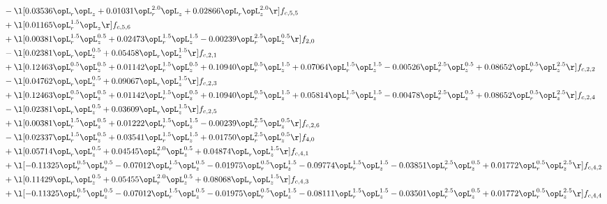\begin{alignat}{2}
& - \l[  0.03536 \opL_r \opL_z +  0.01031 \opL_r^{2.0} \opL_z +  0.02866 \opL_r \opL_z^{2.0}  \r] f_{c,5,5} \nonumber \\ 
& + \l[  0.01165 \opL_r^{1.5} \opL_z  \r] f_{c,5,6} \nonumber \\ 
& + \l[  0.00381 \opL_r^{1.5} \opL_z^{0.5} +  0.02473 \opL_r^{1.5} \opL_z^{1.5}   -0.00239 \opL_r^{2.5} \opL_z^{0.5}  \r] f_{2,0} \nonumber \\ 
& - \l[  0.02381 \opL_r \opL_z^{0.5} +  0.05458 \opL_r \opL_z^{1.5}  \r] f_{c,2,1} \nonumber \\ 
& + \l[  0.12463 \opL_r^{0.5} \opL_z^{0.5} +  0.01142 \opL_r^{1.5} \opL_z^{0.5} +  0.10940 \opL_r^{0.5} \opL_z^{1.5} +  0.07064 \opL_r^{1.5} \opL_z^{1.5}   -0.00526 \opL_r^{2.5} \opL_z^{0.5} +  0.08652 \opL_r^{0.5} \opL_z^{2.5}  \r] f_{c,2,2} \nonumber \\ 
& - \l[  0.04762 \opL_r \opL_z^{0.5} +  0.09067 \opL_r \opL_z^{1.5}  \r] f_{c,2,3} \nonumber \\ 
& + \l[  0.12463 \opL_r^{0.5} \opL_z^{0.5} +  0.01142 \opL_r^{1.5} \opL_z^{0.5} +  0.10940 \opL_r^{0.5} \opL_z^{1.5} +  0.05814 \opL_r^{1.5} \opL_z^{1.5}   -0.00478 \opL_r^{2.5} \opL_z^{0.5} +  0.08652 \opL_r^{0.5} \opL_z^{2.5}  \r] f_{c,2,4} \nonumber \\ 
& - \l[  0.02381 \opL_r \opL_z^{0.5} +  0.03609 \opL_r \opL_z^{1.5}  \r] f_{c,2,5} \nonumber \\ 
& + \l[  0.00381 \opL_r^{1.5} \opL_z^{0.5} +  0.01222 \opL_r^{1.5} \opL_z^{1.5}   -0.00239 \opL_r^{2.5} \opL_z^{0.5}  \r] f_{c,2,6} \nonumber \\ 
& - \l[  0.02337 \opL_r^{1.5} \opL_z^{0.5} +  0.03541 \opL_r^{1.5} \opL_z^{1.5} +  0.01750 \opL_r^{2.5} \opL_z^{0.5}  \r] f_{4,0} \nonumber \\ 
& + \l[  0.05714 \opL_r \opL_z^{0.5} +  0.04545 \opL_r^{2.0} \opL_z^{0.5} +  0.04874 \opL_r \opL_z^{1.5}  \r] f_{c,4,1} \nonumber \\ 
& + \l[  -0.11325 \opL_r^{0.5} \opL_z^{0.5}   -0.07012 \opL_r^{1.5} \opL_z^{0.5}   -0.01975 \opL_r^{0.5} \opL_z^{1.5}   -0.09774 \opL_r^{1.5} \opL_z^{1.5}   -0.03851 \opL_r^{2.5} \opL_z^{0.5} +  0.01772 \opL_r^{0.5} \opL_z^{2.5}  \r] f_{c,4,2} \nonumber \\ 
& + \l[  0.11429 \opL_r \opL_z^{0.5} +  0.05455 \opL_r^{2.0} \opL_z^{0.5} +  0.08068 \opL_r \opL_z^{1.5}  \r] f_{c,4,3} \nonumber \\ 
& + \l[  -0.11325 \opL_r^{0.5} \opL_z^{0.5}   -0.07012 \opL_r^{1.5} \opL_z^{0.5}   -0.01975 \opL_r^{0.5} \opL_z^{1.5}   -0.08111 \opL_r^{1.5} \opL_z^{1.5}   -0.03501 \opL_r^{2.5} \opL_z^{0.5} +  0.01772 \opL_r^{0.5} \opL_z^{2.5}  \r] f_{c,4,4} \nonumber \\ 

\end{alignat}
